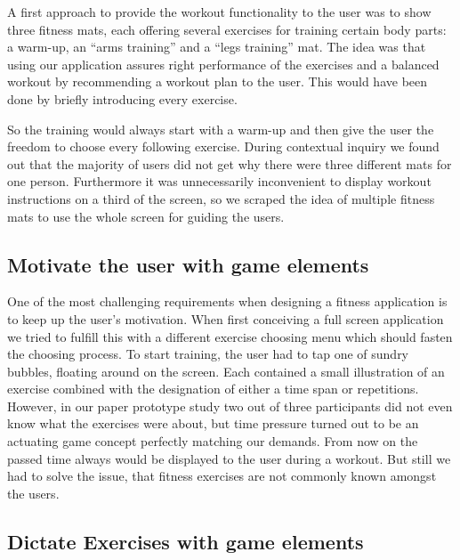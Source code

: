 \documentclass{sigchi}
\begin{document}
    A first approach to provide the workout functionality to the user was to show three fitness mats, each offering several exercises for training certain body parts: a warm-up, an ``arms training'' and a ``legs training'' mat. The idea was that using our application assures right performance of the exercises and a balanced workout by recommending a workout plan to the user. This would have been done by briefly introducing every exercise. 

    So the training would always start with a warm-up and then give the user the freedom to choose every following exercise. During contextual inquiry we found out that the majority of users did not get why there were three different mats for one person. Furthermore it was unnecessarily inconvenient to display workout instructions on a third of the screen, so we scraped the idea of multiple fitness mats to use the whole screen for guiding the users.

  \subsection{Motivate the user with game elements } %
  \label{sub:motivate_the_user_with_game_elements_}

    One of the most challenging requirements when designing a fitness application is to keep up the user's motivation. When first conceiving a full screen application we tried to fulfill this with a different exercise choosing menu which should fasten the choosing process. To start training, the user had to tap one of sundry bubbles, floating around on the screen. Each contained a small illustration of an exercise combined with the designation of either a time span or repetitions. However, in our paper prototype study two out of three participants did not even know what the exercises were about, but time pressure turned out to be an actuating game concept perfectly matching our demands. From now on the passed time always would be displayed to the user during a workout. But still we had to solve the issue, that fitness exercises are not commonly known amongst the users.

  \subsection{Dictate Exercises with game elements } %
  \label{sub:dictate_exercises_with_game_elements_}
\end{document}
